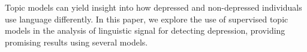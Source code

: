 Topic models can yield insight into how depressed and non-depressed individuals use language differently. In this paper, we explore the use of supervised topic models in the analysis of linguistic signal for detecting depression, providing promising results using several models.
